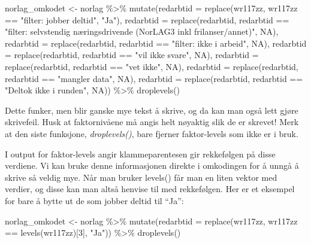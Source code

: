 \documentclass[
  letterpaper,
  DIV=11,
  numbers=noendperiod]{scrreprt}
\newenvironment{Shaded}{\begin{snugshade}}{\end{snugshade}}
\newcommand{\AttributeTok}[1]{\textcolor[rgb]{0.40,0.45,0.13}{#1}}
\newcommand{\ConstantTok}[1]{\textcolor[rgb]{0.56,0.35,0.01}{#1}}
\newcommand{\DecValTok}[1]{\textcolor[rgb]{0.68,0.00,0.00}{#1}}
\newcommand{\FunctionTok}[1]{\textcolor[rgb]{0.28,0.35,0.67}{#1}}
\newcommand{\NormalTok}[1]{\textcolor[rgb]{0.00,0.23,0.31}{#1}}
\newcommand{\OtherTok}[1]{\textcolor[rgb]{0.00,0.23,0.31}{#1}}
\newcommand{\SpecialCharTok}[1]{\textcolor[rgb]{0.37,0.37,0.37}{#1}}
\newcommand{\StringTok}[1]{\textcolor[rgb]{0.13,0.47,0.30}{#1}}
\begin{document}
\begin{Shaded}
\begin{Highlighting}[]
\NormalTok{norlag\_omkodet }\OtherTok{\textless{}{-}}\NormalTok{ norlag }\SpecialCharTok{\%\textgreater{}\%}
  \FunctionTok{mutate}\NormalTok{(}\AttributeTok{redarbtid =} \FunctionTok{replace}\NormalTok{(wr117zz, wr117zz }\SpecialCharTok{==} \StringTok{"filter: jobber deltid"}\NormalTok{, }\StringTok{"Ja"}\NormalTok{), }
         \AttributeTok{redarbtid =} \FunctionTok{replace}\NormalTok{(redarbtid, redarbtid }\SpecialCharTok{==} \StringTok{"filter: selvstendig næringsdrivende (NorLAG3 inkl frilanser/annet)"}\NormalTok{, }\ConstantTok{NA}\NormalTok{), }
         \AttributeTok{redarbtid =} \FunctionTok{replace}\NormalTok{(redarbtid, redarbtid }\SpecialCharTok{==} \StringTok{"filter: ikke i arbeid"}\NormalTok{, }\ConstantTok{NA}\NormalTok{), }
         \AttributeTok{redarbtid =} \FunctionTok{replace}\NormalTok{(redarbtid, redarbtid }\SpecialCharTok{==} \StringTok{"vil ikke svare"}\NormalTok{, }\ConstantTok{NA}\NormalTok{),}
         \AttributeTok{redarbtid =} \FunctionTok{replace}\NormalTok{(redarbtid, redarbtid }\SpecialCharTok{==} \StringTok{"vet ikke"}\NormalTok{, }\ConstantTok{NA}\NormalTok{),}
         \AttributeTok{redarbtid =} \FunctionTok{replace}\NormalTok{(redarbtid, redarbtid }\SpecialCharTok{==} \StringTok{"mangler data"}\NormalTok{, }\ConstantTok{NA}\NormalTok{),}
         \AttributeTok{redarbtid =} \FunctionTok{replace}\NormalTok{(redarbtid, redarbtid }\SpecialCharTok{==} \StringTok{"Deltok ikke i runden"}\NormalTok{, }\ConstantTok{NA}\NormalTok{)) }\SpecialCharTok{\%\textgreater{}\%} 
  \FunctionTok{droplevels}\NormalTok{()}
\end{Highlighting}
\end{Shaded}

Dette funker, men blir ganske mye tekst å skrive, og da kan man også
lett gjøre skrivefeil. Husk at faktornivåene må angis helt nøyaktig slik
de er skrevet! Merk at den siste funksjone, \emph{droplevels()}, bare
fjerner faktor-levels som ikke er i bruk.

I output for faktor-levels angir klammeparentesen gir rekkefølgen på
disse verdiene. Vi kan bruke denne informasjonen direkte i omkodingen
for å unngå å skrive så veldig mye. Når man bruker levels() får man en
liten vektor med verdier, og disse kan man altså henvise til med
rekkefølgen. Her er et eksempel for bare å bytte ut de som jobber deltid
til ``Ja'':

\begin{Shaded}
\begin{Highlighting}[]
\NormalTok{norlag\_omkodet }\OtherTok{\textless{}{-}}\NormalTok{ norlag }\SpecialCharTok{\%\textgreater{}\%}
  \FunctionTok{mutate}\NormalTok{(}\AttributeTok{redarbtid =} \FunctionTok{replace}\NormalTok{(wr117zz, wr117zz }\SpecialCharTok{==} \FunctionTok{levels}\NormalTok{(wr117zz)[}\DecValTok{3}\NormalTok{], }\StringTok{"Ja"}\NormalTok{)) }\SpecialCharTok{\%\textgreater{}\%} 
  \FunctionTok{droplevels}\NormalTok{()}
\end{Highlighting}
\end{Shaded}
\end{document}
